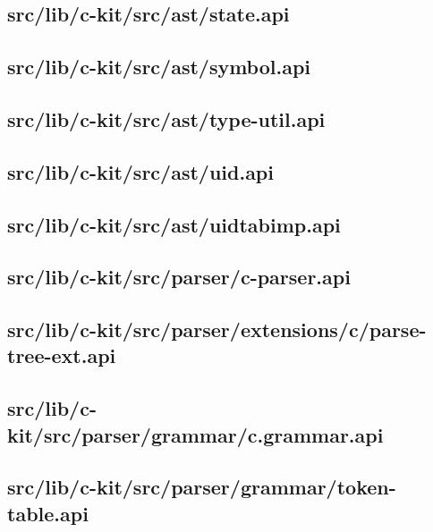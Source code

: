 \subsection{src/lib/c-kit/src/ast/state.api}


\subsection{src/lib/c-kit/src/ast/symbol.api}


\subsection{src/lib/c-kit/src/ast/type-util.api}


\subsection{src/lib/c-kit/src/ast/uid.api}


\subsection{src/lib/c-kit/src/ast/uidtabimp.api}


\subsection{src/lib/c-kit/src/parser/c-parser.api}


\subsection{src/lib/c-kit/src/parser/extensions/c/parse-tree-ext.api}


\subsection{src/lib/c-kit/src/parser/grammar/c.grammar.api}


\subsection{src/lib/c-kit/src/parser/grammar/token-table.api}


